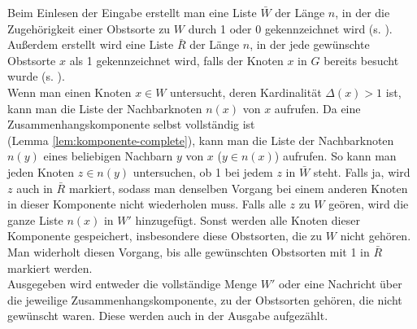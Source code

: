 Beim Einlesen der Eingabe erstellt man eine Liste $\bar{W}$ der Länge $n$,
in der die Zugehörigkeit einer Obstsorte zu $W$ durch 1 oder 0 gekennzeichnet wird
(s. ). Außerdem erstellt wird eine Liste $\bar{R}$ der Länge $n$,
in der jede gewünschte Obstsorte $x$ als 1 gekennzeichnet wird, falls der Knoten $x$ in $G$ bereits
besucht wurde (s. ).\\

Wenn man einen Knoten $x \in W$ untersucht, deren Kardinalität $\Delta(x) > 1$ ist,
kann man die Liste der Nachbarknoten $n(x)$ von $x$ aufrufen.
Da eine Zusammenhangskomponente selbst vollständig ist\\ (Lemma \ref{lem:komponente-complete}),
kann man die Liste der Nachbarknoten $n(y)$ eines beliebigen Nachbarn $y$ von $x$ ($y \in n(x)$) aufrufen.
So kann man jeden Knoten $z \in n(y)$ untersuchen, ob 1 bei jedem $z$ in $\bar{W}$ steht.
Falls ja, wird $z$ auch in $\bar{R}$ markiert,
sodass man denselben Vorgang bei einem anderen Knoten in dieser Komponente nicht wiederholen muss.
Falls alle $z$ zu $W$ geören, wird
die ganze Liste $n(x)$ in $W'$ hinzugefügt. Sonst werden alle Knoten dieser Komponente 
gespeichert, insbesondere diese Obstsorten, die zu $W$ nicht gehören.\\
Man widerholt diesen Vorgang, bis alle gewünschten Obstsorten mit 1 in $\bar{R}$ markiert werden.\\

Ausgegeben wird entweder die vollständige Menge $W'$ oder eine Nachricht über die jeweilige 
Zusammenhangskomponente, zu der Obstsorten gehören, die nicht gewünscht waren.
Diese werden auch in der Ausgabe aufgezählt.
